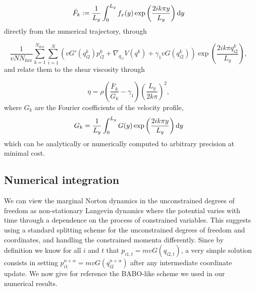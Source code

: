 \begin{equation}
    \label{eq:norton_fourier_coefficients}
    \bar F_k\mathrel{\mathop:}=\frac{1}{L_y}\int_0^{L_y}f_x(y)\exp\left(\frac{2ik\pi y}{L_y}\right)\mathrm{d} y
\end{equation}
directly from the numerical trajectory, through

\begin{equation}
    \label{eq:norton_fourier_estimator}
    \frac{1}{vN N_{\mathrm{iter}}}\sum_{k=1}^{N_{\mathrm{iter}}}\sum_{i=1}^N\left(vG'\left(q_{i2}^k\right)p_{i2}^k+\nabla_{q_{i1}}V(q^k)+\gamma_1vG\left(q_{i2}^k\right)\right)\exp\left(\frac{2ik\pi q_{i2}^k}{L_y}\right),
\end{equation}
and relate them to the shear viscosity through

\begin{equation}
    \label{eq:norton_shear_viscosity_estimator}
    \eta=\rho\left(\frac{\bar F_k}{G_k} -\gamma_1\right)\left(\frac{L_y}{2k\pi}\right)^2,
\end{equation}
where $G_k$ are the Fourier coefficients of the velocity profile,
\[G_k=\frac{1}{L_y}\int_0^{L_y} G(y)\exp\left(\frac{2ik\pi y}{L_y}\right)\mathrm{d} y\]
which can be analytically or numerically computed to arbitrary precision at minimal cost.

\subsection{Numerical integration}
We can view the marginal Norton dynamics in the unconstrained degrees of freedom as non-stationary Langevin dynamics where the potential varies with time through a dependence on the process of constrained variables.
This suggests using a standard splitting scheme for the unconstrained degrees of freedom and coordinates, and handling the constrained momenta differently. Since by definition we know for all $i$ and $t$ that $p_{i1,t}=mvG(q_{i2,t})$, a very simple solution consists in setting
$p^{n+\alpha}_{i1}=mv G(q^{n+\alpha}_{i2})$ after any intermediate coordinate update. We now give for reference the BABO-like scheme we used in our numerical results.

